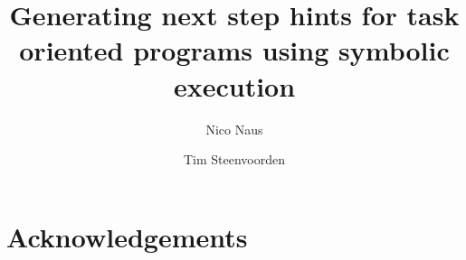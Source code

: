 \documentclass[runningheads]{llncs}
\begin{document}
\title{Generating next step hints for task oriented programs using symbolic execution}


\author{
  Nico Naus\and
  Tim Steenvoorden
}



\maketitle              %

\begin{abstract}
  
\end{abstract}






% 



\section*{Acknowledgements}





\newpage
\appendix






\end{document}
